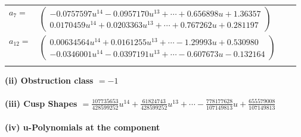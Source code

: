 \documentclass[1p]{elsarticle_modified}
\theoremstyle{definition}
\begin{document}
\begin{tabular}{m{7pt} m{180pt} m{7pt} m{180pt} }
\flushright $a_{7}=$&$\begin{pmatrix}-0.0757597 u^{14}-0.0957170 u^{13}+\cdots+0.656898 u+1.36357\\0.0170459 u^{14}+0.0203363 u^{13}+\cdots+0.767262 u+0.281197\end{pmatrix}$ \\
\flushright $a_{12}=$&$\begin{pmatrix}0.00634564 u^{14}+0.0161255 u^{13}+\cdots-1.29993 u+0.530980\\-0.0346001 u^{14}-0.0397191 u^{13}+\cdots-0.607673 u-0.132164\end{pmatrix}$\\&\end{tabular}
\flushleft \textbf{(ii) Obstruction class $= -1$}\\~\\
\flushleft \textbf{(iii) Cusp Shapes $= \frac{107735653}{428599252} u^{14}+\frac{61824743}{428599252} u^{13}+\cdots-\frac{778177628}{107149813} u+\frac{655579008}{107149813}$}\\~\\
\newpage\renewcommand{\arraystretch}{1}
\flushleft \textbf{(iv) u-Polynomials at the component}\newline \\
\end{document}
